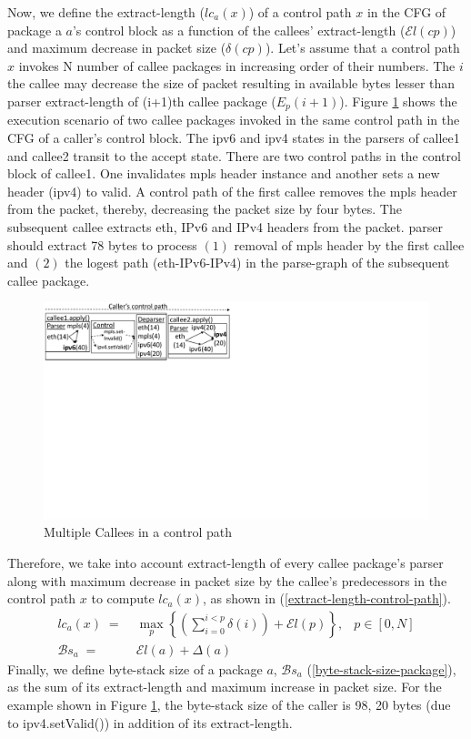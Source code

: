 \documentclass[letterpaper,twocolumn,10pt]{article}
\begin{document}
Now, we define the extract-length ($lc_{a}(x)$) of a control path $x$ in the CFG of package a $a$'s control block as a function of the callees' extract-length ($\mathcal{E}l(cp)$) and maximum decrease in packet size ($\delta(cp)$).
Let's assume that a control path $x$ invokes N number of callee packages in increasing order of their numbers. 
The $i$the callee may decrease the size of packet resulting in available bytes lesser than parser extract-length of (i+1)th callee package ($E_{p}(i+1)$).
Figure \ref{fig:sequential-callees} shows the execution scenario of two callee packages invoked in the same control path in the CFG of a caller's control block.
The ipv6 and ipv4 states in the parsers of callee1 and callee2 transit to the accept state.
There are two control paths in the control block of callee1. One invalidates mpls header instance and another sets a new header (ipv4) to valid.
A control path of the first callee removes the mpls header from the packet, thereby, decreasing the packet size by four bytes.
The subsequent callee extracts eth, IPv6 and IPv4 headers from the packet.
\ucomp parser should extract 78 bytes to process $(1)$ removal of mpls header by the first callee and $(2)$ the logest path (eth-IPv6-IPv4) in the parse-graph of the subsequent callee package.
\begin{figure}[!h]
    \centering
    \includegraphics[trim=0 396 487 0, clip,scale=0.5]{sequential-callees}
    \caption{Multiple Callees in a control path}
    \label{fig:sequential-callees}
\end{figure}
Therefore, we take into account extract-length of every callee package's parser along with maximum decrease in packet size by the callee's predecessors in the control path $x$ to compute $lc_{a}(x)$, as shown in (\ref{extract-length-control-path}).
\begin{align}
lc_{a}(x) \; =& \; \max_{p} \left\{ \left( \sum_{i=0}^{i<p} \delta(i) \right)+ \mathcal{E}l(p) \right\},&p \in [0,N] \label{extract-length-control-path} \\
\mathcal{B}s_{a} \; =& \; \mathcal{E}l(a) + \Delta(a) & \label{byte-stack-size-package}
\end{align}
Finally, we define byte-stack size of a package $a$, $\mathcal{B}s_{a}$ (\ref{byte-stack-size-package}), as the sum of its extract-length and maximum increase in packet size.
For the example shown in Figure \ref{fig:sequential-callees}, the byte-stack size of the caller is 98, 20 bytes (due to ipv4.setValid()) in addition of its extract-length.
\end{document}
